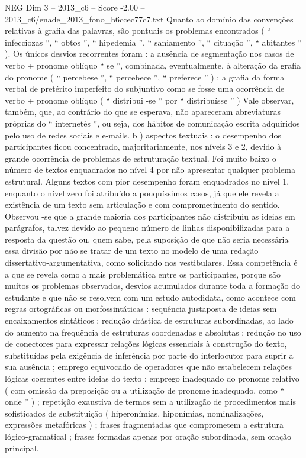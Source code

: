 \begin{textsample}{NEG Dim 3 – 2013\_c6 – Score -2.00 – 2013\_c6/enade\_2013\_fono\_b6ccec77c7.txt}
Quanto ao domínio das convenções relativas à grafia das palavras, são pontuais os problemas encontrados ( “ infecciozas ”, “ obtos ”, “ hipedemia ”, “ saniamento ”, “ cituação ”, “ abitantes ” ).
Os únicos desvios recorrentes foram : a ausência de segmentação nos casos de verbo + pronome oblíquo “ se ”, combinada, eventualmente, à alteração da grafia do pronome ( “ percebese ”, “ percebece ”, “ preferece ” ) ; a grafia da forma verbal de pretérito imperfeito do subjuntivo como se fosse uma ocorrência de verbo + pronome oblíquo ( “ distribui -se ” por “ distribuísse ” ) Vale observar, também, que, ao contrário do que se esperava, não apareceram abreviaturas próprias do “ internetês ”, ou seja, dos hábitos de comunicação escrita adquiridos pelo uso de redes sociais e e-mails. b ) aspectos textuais : o desempenho dos participantes ficou concentrado, majoritariamente, nos níveis 3 e 2, devido à grande ocorrência de problemas de estruturação textual.
Foi muito baixo o número de textos enquadrados no nível 4 por não apresentar qualquer problema estrutural.
Alguns textos com pior desempenho foram enquadrados no nível 1, enquanto o nível zero foi atribuído a pouquíssimos casos, já que ele revela a existência de um texto sem articulação e com comprometimento do sentido.
Observou -se que a grande maioria dos participantes não distribuiu as ideias em parágrafos, talvez devido ao pequeno número de linhas disponibilizadas para a resposta da questão ou, quem sabe, pela suposição de que não seria necessária essa divisão por não se tratar de um texto no modelo de uma redação dissertativo-argumentativa, como solicitado nos vestibulares.
Essa competência é a que se revela como a mais problemática entre os participantes, porque são muitos os problemas observados, desvios acumulados durante toda a formação do estudante e que não se resolvem com um estudo autodidata, como acontece com regras ortográficas ou morfossintáticas : sequência justaposta de ideias sem encaixamentos sintáticos ; redução drástica de estruturas subordinadas, ao lado do aumento na frequência de estruturas coordenadas e absolutas ; redução no uso de conectores para expressar relações lógicas essenciais à construção do texto, substituídas pela exigência de inferência por parte do interlocutor para suprir a sua ausência ; emprego equivocado de operadores que não estabelecem relações lógicas coerentes entre ideias do texto ; emprego inadequado do pronome relativo ( com omissão da preposição ou a utilização de pronome inadequado, como “ onde ” ) ; repetição exaustiva de termos sem a utilização de procedimentos mais sofisticados de substituição ( hiperonímias, hiponímias, nominalizações, expressões metafóricas ) ; frases fragmentadas que comprometem a estrutura lógico-gramatical ; frases formadas apenas por oração subordinada, sem oração principal.

\end{textsample}
